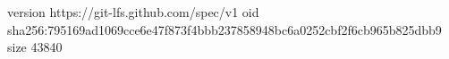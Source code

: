 version https://git-lfs.github.com/spec/v1
oid sha256:795169ad1069cce6e47f873f4bbb237858948bc6a0252cbf2f6cb965b825dbb9
size 43840
